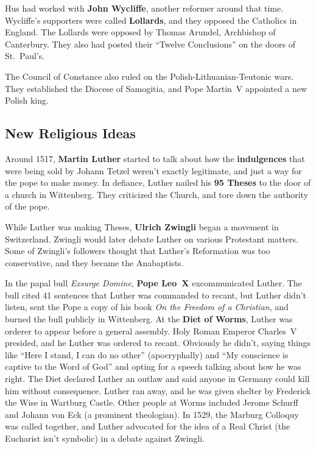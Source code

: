 Hus had worked with \textbf{John Wycliffe}, another reformer around that time.
Wycliffe's supporters were called \textbf{Lollards}, and they opposed the Catholics in England.
The Lollards were opposed by Thomas Arundel, Archbishop of Canterbury.
They also had posted their ``Twelve Conclusions'' on the doors of St.\ Paul's.

The Council of Constance also ruled on the Polish-Lithuanian-Teutonic wars.
They established the Diocese of Samogitia, and Pope Martin~V appointed a new Polish king.

\subsection*{New Religious Ideas}

Around 1517, \textbf{Martin Luther} started to talk about how the \textbf{indulgences}
that were being sold by Johann Tetzel weren't exactly legitimate, and just a way for the pope to make money.
In defiance, Luther nailed his \textbf{95 Theses} to the door of a church in Wittenberg.
They criticized the Church, and tore down the authority of the pope.

While Luther was making Theses, \textbf{Ulrich Zwingli} began a movement in Switzerland.
Zwingli would later debate Luther on various Protestant matters.
Some of Zwingli's followers thought that Luther's Reformation was too conservative, and they became the Anabaptists.

In the papal bull \textit{Exsurge Domine}, \textbf{Pope Leo~X} excommunicated Luther.
The bull cited 41 sentences that Luther was commanded to recant,
but Luther didn't listen, sent the Pope a copy of his book \textit{On the Freedom of a Christian},
and burned the bull publicly in Wittenberg.
At the \textbf{Diet of Worms}, Luther was orderer to appear before a general assembly.
Holy Roman Emperor Charles~V presided, and he Luther was ordered to recant.
Obviously he didn't, saying things like
``Here I stand, I can do no other'' (apocryphally) and
``My conscience is captive to the Word of God''
and opting for a speech talking about how he was right.
The Diet declared Luther an outlaw and said anyone in Germany could kill him without consequence.
Luther ran away, and he was given shelter by Frederick the Wise in Wartburg Castle.
Other people at Worms included Jerome Schurff and Johann von Eck (a prominent theologian).
In 1529, the Marburg Colloquy was called together,
and Luther advocated for the idea of a Real Christ (the Eucharist isn't symbolic) in a debate against Zwingli.


